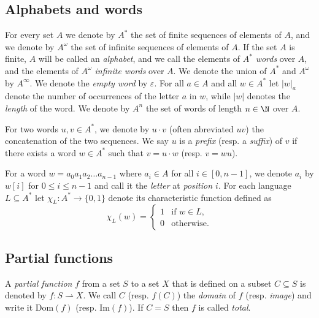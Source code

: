 \subsection{Alphabets and words}

For every set $A$ we denote by $A^*$ the set of finite
sequences of elements of $A$, and we denote by $A^\omega$ the set of infinite sequences of elements of $A$. If the set $A$ is finite, $A$ will be called an {\em alphabet},
and we call the elements of $A^*$ {\em words} over $A$,
and the elements of $A^\omega$ {\em infinite words} over $A$. 
We denote
the union of $A^*$ and $A^\omega$ by
$A^\infty$.
We denote the {\em empty word} by $\varepsilon$.
For all $a\in A$ and all $w\in A^*$ let $|w|_a$ denote the number of occurrences
of the letter $a$ in $w$, while $|w|$ denotes the {\em length} of the word.
We denote by $A^n$ the set of words of length $n \in \N$ over %
$A$. 


For two words $u, v \in A^*$, we denote by $u \cdot v$ (often abreviated $uv$) the
concatenation of the two sequences. We say $u$ is a {\em prefix} (resp. a {\em suffix}) of $v$ if there exists a word $w \in A^*$ such that $v = u \cdot w$ (resp. $v = wu$).

For a word $w = a_0 a_1 a_2  \ldots  a_{n-1}$ where $a_i \in A$ for all $i \in [0,n-1]$, we denote 
$a_i$ by $w[i]$ for $0 \leq i \leq n - 1$ and call it the {\em letter} at {\em position $i$}.
For each language $L\subseteq A^*$ let $\chi_L:A^*\rightarrow\{0,1\}$ denote its characteristic function defined as
$$
\chi_L(w)=\begin{cases}1&\text{if $w \in L,$}\\
	0 &\text{otherwise}.
\end{cases}
$$



\subsection{Partial functions} \label{partial}

A {\em partial function} $f$ from a set $S$ to a set $X$ 
that is defined on a subset $C \subseteq S$
is denoted by
$ f : S \rightharpoonup X $.
We call $C$ (resp.  $f(C)$) the {\em domain} of $f$ (resp. {\em image}) and write it 
$\text{Dom}(f)$ (resp. $\text{Im}(f)$).
If $C=S$ then %
$f$
 is called {\em total}.

